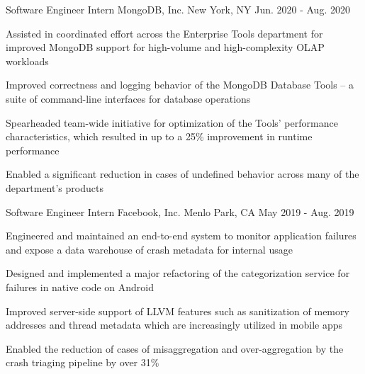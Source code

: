 


\begin{cventries}

  \cventry
  {Software Engineer Intern} %
  {MongoDB, Inc.} %
  {New York, NY} %
  {Jun. 2020 - Aug. 2020} %
  { %
    \begin{cvitems}
        \item {Assisted in coordinated effort across the Enterprise Tools department for improved MongoDB support for high-volume and high-complexity OLAP workloads}
        \item {Improved correctness and logging behavior of the MongoDB Database Tools -- a suite of command-line interfaces for database operations}
        \item {Spearheaded team-wide initiative for optimization of the Tools' performance characteristics, which resulted in up to a 25\% improvement in runtime performance}
        \item {Enabled a significant reduction in cases of undefined behavior across many of the department's products}
    \end{cvitems}
  }
  
  \cventry
  {Software Engineer Intern} %
  {Facebook, Inc.} %
  {Menlo Park, CA} %
  {May 2019 - Aug. 2019} %
  { %
    \begin{cvitems}
        \item {Engineered and maintained an end-to-end system to monitor application failures and expose a data warehouse of crash metadata for internal usage}
        \item {Designed and implemented a major refactoring of the categorization service for failures in native code on Android}
        \item {Improved server-side support of LLVM features such as sanitization of memory addresses and thread metadata which are increasingly utilized in mobile apps}
        \item {Enabled the reduction of cases of misaggregation and over-aggregation by the crash triaging pipeline by over 31\%}
    \end{cvitems}
  }
\end{cventries}
